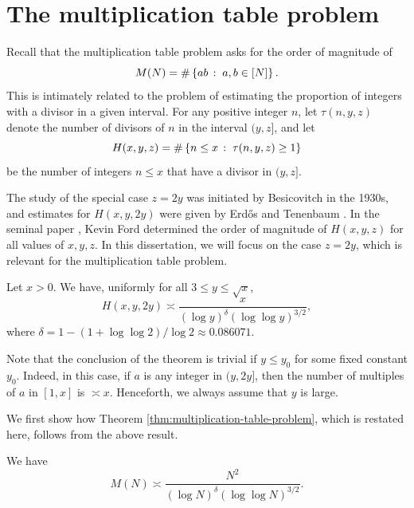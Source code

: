 \section{The multiplication table problem}
    \label{sec:multiplication-table-problem}

Recall that the multiplication table problem asks for the order of magnitude of
\begin{equation*}
    M(N) = \# \left\{ ab\,:\; a, b \in [N]\right\}.
\end{equation*}
This is intimately related to the problem of estimating the proportion of integers with a divisor in a given interval. 
For any positive integer $n$, let $\tau(n, y, z)$ denote the number of divisors of $n$ in the interval $(y, z]$, and let
\begin{equation*}
    H(x, y, z) = \#\left\{ n \le x\,:\;\tau(n, y, z) \ge 1\right\}
\end{equation*}
be the number of integers $n \le x$ that have a divisor in $(y, z]$.

The study of the special case $z = 2y$ was initiated by Besicovitch \cite{besicovitch} in the 1930s, and estimates for $H(x, y, 2y)$ were given by Erd\H{o}s \cite{anasymptoticinequality} and Tenenbaum \cite{tenenbaumsurlaprobabilite}.
In the seminal paper \cite{thedistributionofintegers}, Kevin Ford determined the order of magnitude of $H(x, y, z)$ for all values of $x, y, z$.
In this dissertation, we will focus on the case $z = 2y$, which is relevant for the multiplication table problem.

\begin{theorem} \label{thm:integers-with-a-divisor-in-y-2y}
    Let $x > 0$. 
    We have, uniformly for all $3 \le y \le \sqrt{x}$,
    \begin{equation*}
        H(x, y, 2y) \asymp \frac{x}{(\log y)^\delta (\log \log y)^{3/2}},
    \end{equation*}
    where $\delta = 1 - (1 + \log \log 2) / \log 2 \approx 0.086071$.
\end{theorem} 
Note that the conclusion of the theorem is trivial if $y \le y_0$ for some fixed constant $y_0$.
Indeed, in this case, if $a$ is any integer in $(y, 2y]$, then the number of multiples of $a$ in $[1, x]$ is $\asymp x$.
Henceforth, we always assume that $y$ is large.

We first show how Theorem \ref{thm:multiplication-table-problem}, which is restated here, follows from the above result.
\begingroup
\def\thedefinition{\ref*{thm:multiplication-table-problem}}
\begin{theorem}
    We have
    \begin{equation*}
        M(N)  \asymp \frac{N^2}{(\log N)^\delta (\log \log N)^{3/2}}.
    \end{equation*}
\end{theorem}
\addtocounter{definition}{-1}
\endgroup


